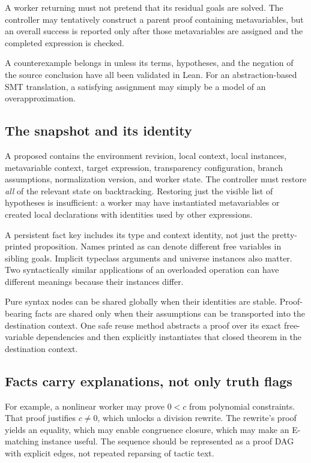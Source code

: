 A worker returning  must not pretend that its residual goals
are solved. The controller may tentatively construct a parent proof containing
metavariables, but an overall success is reported only after those
metavariables are assigned and the completed expression is checked.

A counterexample belongs in  unless its terms, hypotheses,
and the negation of the source conclusion have all been validated in Lean.
For an abstraction-based SMT translation, a satisfying assignment may simply
be a model of an overapproximation.

\subsection{The snapshot and its identity}

A proposed  contains the environment revision, local
context, local instances, metavariable context, target expression, transparency
configuration, branch assumptions, normalization version, and worker state.
The controller must restore \emph{all} of the relevant state on backtracking.
Restoring just the visible list of hypotheses is insufficient: a worker may
have instantiated metavariables or created local declarations with identities
used by other expressions.

A persistent fact key includes its type and context identity, not just the
pretty-printed proposition. Names printed as  can denote different
free variables in sibling goals. Implicit typeclass arguments and universe
instances also matter. Two syntactically similar applications of an overloaded
operation can have different meanings because their instances differ.

Pure syntax nodes can be shared globally when their identities are stable.
Proof-bearing facts are shared only when their assumptions can be transported
into the destination context. One safe reuse method abstracts a proof over
its exact free-variable dependencies and then explicitly instantiates that
closed theorem in the destination context.

\subsection{Facts carry explanations, not only truth flags}

For example, a nonlinear worker may prove $0<c$ from polynomial constraints.
That proof justifies $c\ne0$, which unlocks a division rewrite. The rewrite's
proof yields an equality, which may enable congruence closure, which may make
an E-matching instance useful. The sequence should be represented as a proof
DAG with explicit edges, not repeated reparsing of tactic text.

